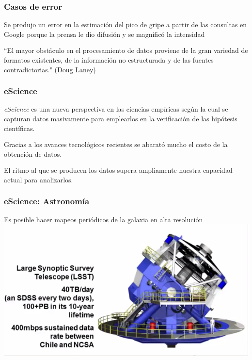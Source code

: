\documentclass{beamer}
\begin{document}
\begin{frame}

\frametitle{Casos de error}
	Se produjo un error en la estimaci\'on del pico de gripe a partir 
	de las consultas en Google porque la prensa le dio difusi\'on y se 
	magnific\'o la intensidad
\end{frame}



\begin {frame}

``El mayor obst\'aculo en el procesamiento de datos proviene de la gran 
variedad de formatos existentes, de la informaci\'on no estructurada y 
de las fuentes contradictorias." (Doug Laney)

\end{frame}


\begin {frame}
\frametitle{eScience}

\emph{eScience} es una nueva perspectiva en las ciencias emp\'iricas 
seg\'un la cual se capturan datos masivamente para emplearlos en la 
verificaci\'on de las hip\'otesis cient\'ificas.

\bigskip

Gracias a los avances tecnol\'ogicos recientes se abarat\'o mucho el 
costo de la obtenci\'on de datos.

\bigskip

El ritmo al que se producen los datos supera ampliamente nuestra 
capacidad actual para analizarlos.

\end{frame}

\begin{frame}
\frametitle{eScience: Astronom\'ia}
Es posible hacer mapeos peri\'odicos de la galaxia en alta resoluci\'on
\includegraphics[scale=.5]{img/astronomia.png}
\end{frame}
\end{document}
